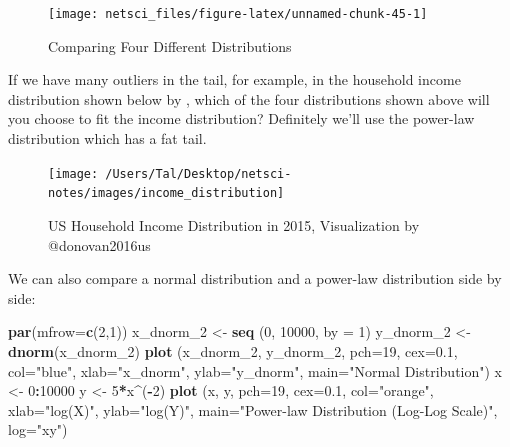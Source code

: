 \documentclass[
]{krantz}
\makeatletter
\newenvironment{Shaded}{\begin{snugshade}}{\end{snugshade}}
\newcommand{\DataTypeTok}[1]{\textcolor[rgb]{0.27,0.27,0.27}{#1}}
\newcommand{\DecValTok}[1]{\textcolor[rgb]{0.06,0.06,0.06}{#1}}
\newcommand{\FloatTok}[1]{\textcolor[rgb]{0.06,0.06,0.06}{#1}}
\newcommand{\KeywordTok}[1]{\textcolor[rgb]{0.27,0.27,0.27}{\textbf{#1}}}
\newcommand{\NormalTok}[1]{#1}
\newcommand{\OperatorTok}[1]{\textcolor[rgb]{0.43,0.43,0.43}{\textbf{#1}}}
\newcommand{\StringTok}[1]{\textcolor[rgb]{0.5,0.5,0.5}{#1}}
\newenvironment{kframe}{%
\medskip{}
\setlength{\fboxsep}{.8em}
 \def\at@end@of@kframe{}%
 \ifinner\ifhmode%
  \def\at@end@of@kframe{\end{minipage}}%
  \begin{minipage}{\columnwidth}%
 \fi\fi%
 \def\FrameCommand##1{\hskip\@totalleftmargin \hskip-\fboxsep
 \colorbox{shadecolor}{##1}\hskip-\fboxsep
     \hskip-\linewidth \hskip-\@totalleftmargin \hskip\columnwidth}%
 \MakeFramed {\advance\hsize-\width
   \@totalleftmargin\z@ \linewidth\hsize
   \@setminipage}}%
 {\par\unskip\endMakeFramed%
 \at@end@of@kframe}
\renewenvironment{Shaded}{\begin{kframe}}{\end{kframe}}
\makeatother
\begin{document}
\begin{figure}

{\centering \texttt{[image: netsci\_files/figure-latex/unnamed-chunk-45-1]} 

}

\caption{Comparing Four Different Distributions}\label{fig:unnamed-chunk-45}
\end{figure}

If we have many outliers in the tail, for example, in the household income distribution shown below by \citet{donovan2016us}, which of the four distributions shown above will you choose to fit the income distribution? Definitely we'll use the power-law distribution which has a fat tail.

\begin{figure}

{\centering \texttt{[image: /Users/Tal/Desktop/netsci-notes/images/income\_distribution]} 

}

\caption{US Household Income Distribution in 2015, Visualization by @donovan2016us}\label{fig:unnamed-chunk-46}
\end{figure}

We can also compare a normal distribution and a power-law distribution side by side:

\begin{Shaded}
\begin{Highlighting}[]
\KeywordTok{par}\NormalTok{(}\DataTypeTok{mfrow=}\KeywordTok{c}\NormalTok{(}\DecValTok{2}\NormalTok{,}\DecValTok{1}\NormalTok{))}
\NormalTok{x_dnorm_}\DecValTok{2}\NormalTok{ <-}\StringTok{ }\KeywordTok{seq}\NormalTok{ (}\DecValTok{0}\NormalTok{, }\DecValTok{10000}\NormalTok{, }\DataTypeTok{by =} \DecValTok{1}\NormalTok{)}
\NormalTok{y_dnorm_}\DecValTok{2}\NormalTok{ <-}\KeywordTok{dnorm}\NormalTok{(x_dnorm_}\DecValTok{2}\NormalTok{)}
\KeywordTok{plot}\NormalTok{ (x_dnorm_}\DecValTok{2}\NormalTok{, y_dnorm_}\DecValTok{2}\NormalTok{, }\DataTypeTok{pch=}\DecValTok{19}\NormalTok{, }\DataTypeTok{cex=}\FloatTok{0.1}\NormalTok{, }\DataTypeTok{col=}\StringTok{"blue"}\NormalTok{,}
      \DataTypeTok{xlab=}\StringTok{"x_dnorm"}\NormalTok{, }\DataTypeTok{ylab=}\StringTok{"y_dnorm"}\NormalTok{,}
      \DataTypeTok{main=}\StringTok{"Normal Distribution"}\NormalTok{)}
\NormalTok{x <-}\StringTok{ }\DecValTok{0}\OperatorTok{:}\DecValTok{10000}
\NormalTok{y <-}\StringTok{ }\DecValTok{5}\OperatorTok{*}\NormalTok{x}\OperatorTok{^}\NormalTok{(}\OperatorTok{-}\DecValTok{2}\NormalTok{)}
\KeywordTok{plot}\NormalTok{ (x, y, }\DataTypeTok{pch=}\DecValTok{19}\NormalTok{, }\DataTypeTok{cex=}\FloatTok{0.1}\NormalTok{, }\DataTypeTok{col=}\StringTok{"orange"}\NormalTok{,}
      \DataTypeTok{xlab=}\StringTok{"log(X)"}\NormalTok{, }\DataTypeTok{ylab=}\StringTok{"log(Y)"}\NormalTok{,}
      \DataTypeTok{main=}\StringTok{"Power-law Distribution (Log-Log Scale)"}\NormalTok{,}
      \DataTypeTok{log=}\StringTok{"xy"}\NormalTok{)}
\end{Highlighting}
\end{Shaded}
\end{document}
